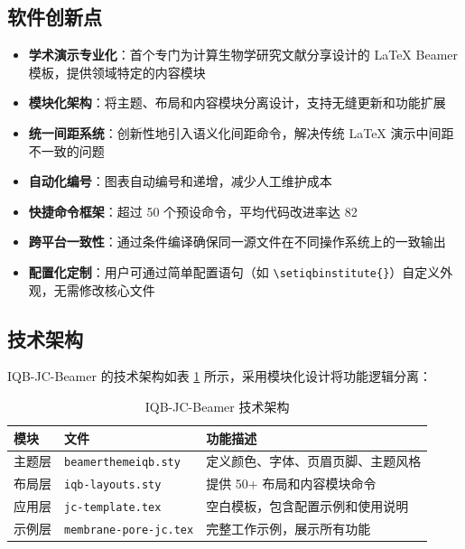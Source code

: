 \subsection{软件创新点}

\begin{itemize}
    \item \textbf{学术演示专业化}：首个专门为计算生物学研究文献分享设计的 LaTeX Beamer 模板，提供领域特定的内容模块

    \item \textbf{模块化架构}：将主题、布局和内容模块分离设计，支持无缝更新和功能扩展

    \item \textbf{统一间距系统}：创新性地引入语义化间距命令，解决传统 LaTeX 演示中间距不一致的问题

    \item \textbf{自动化编号}：图表自动编号和递增，减少人工维护成本

    \item \textbf{快捷命令框架}：超过 50 个预设命令，平均代码改进率达 82%

    \item \textbf{跨平台一致性}：通过条件编译确保同一源文件在不同操作系统上的一致输出

    \item \textbf{配置化定制}：用户可通过简单配置语句（如 \lstinline|\setiqbinstitute{}|）自定义外观，无需修改核心文件
\end{itemize}

\subsection{技术架构}

IQB-JC-Beamer 的技术架构如表 \ref{tab:architecture} 所示，采用模块化设计将功能逻辑分离：

\begin{table}[h]
\centering
\caption{IQB-JC-Beamer 技术架构}
\label{tab:architecture}
\begin{tabular}{p{2.5cm}p{4cm}p{7cm}}
\toprule
\textbf{模块} & \textbf{文件} & \textbf{功能描述} \\
\midrule
主题层 & \lstinline|beamerthemeiqb.sty| & 定义颜色、字体、页眉页脚、主题风格 \\
\midrule
布局层 & \lstinline|iqb-layouts.sty| & 提供 50+ 布局和内容模块命令 \\
\midrule
应用层 & \lstinline|jc-template.tex| & 空白模板，包含配置示例和使用说明 \\
\midrule
示例层 & \lstinline|membrane-pore-jc.tex| & 完整工作示例，展示所有功能 \\
\bottomrule
\end{tabular}
\end{table}


